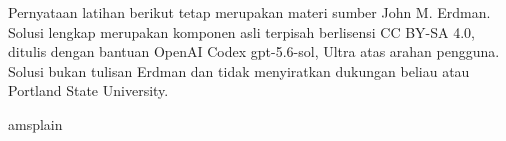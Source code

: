 \documentclass[11pt,reqno]{amsbook}
\theoremstyle{definition}
\theoremstyle{remark}
\numberwithin{equation}{section}
\begin{document}
Pernyataan latihan berikut tetap merupakan materi sumber John M. Erdman.
Solusi lengkap merupakan komponen asli terpisah berlisensi CC BY-SA 4.0,
ditulis dengan bantuan OpenAI Codex gpt-5.6-sol, Ultra atas arahan pengguna.
Solusi bukan tulisan Erdman dan tidak menyiratkan dukungan beliau atau
Portland State University.















\backmatter


 \clearpage
  {amsplain}
 


 \cleardoublepage
 \printindex
\end{document}
